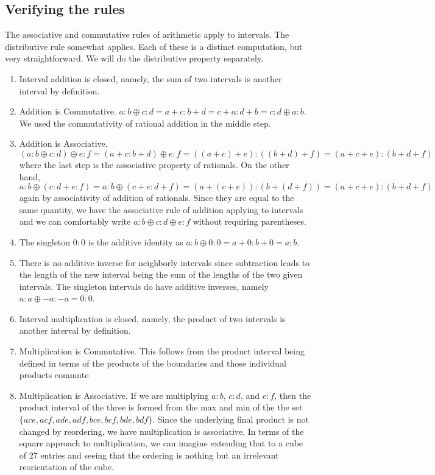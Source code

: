 \documentclass[12pt]{article}
\theoremstyle{remark}
\begin{document}
\subsection{Verifying the rules}\label{sec:rules}

The associative and commutative rules of arithmetic apply to intervals. The distributive rule somewhat applies. Each of these is a distinct computation, but very straightforward. We will do the distributive property separately. 

\begin{enumerate}
    \item Interval addition is closed, namely, the sum of two intervals is another interval by definition. 
    \item Addition is Commutative. $a:b \oplus c:d= a+c : b+d = c+a:d+b = c:d \oplus a:b$. We used the commutativity of rational addition in the middle step. 
    \item Addition is Associative. $(a:b \oplus c:d) \oplus e:f = (a+c:b+d) \oplus e:f = ((a+c)+e):((b+d)+f) = (a+c+e):(b+d+f)$ where the last step is the associative property of rationals.  On the other hand, $a:b \oplus (c:d+e:f) = a:b \oplus (c+e:d+f) = (a+(c+e)):(b+(d+f)) = (a+c+e):(b+d+f)$ again by associativity of addition of rationals. Since they are equal to the same quantity, we have the associative rule of addition applying to intervals and we can comfortably write $a:b \oplus c:d \oplus e:f$ without requiring parentheses. 
    \item The singleton $0:0$ is the additive identity as $a:b \oplus 0:0 = a+0:b+0 = a:b$. 
    \item There is no additive inverse for neighborly intervals since subtraction leads to the length of the new interval being the sum of the lengths of the two given intervals. The singleton intervals do have additive inverses, namely $a:a \oplus -a:-a = 0:0$. 
    \item Interval multiplication is closed, namely, the product of two intervals is another interval by definition. 
    \item Multiplication is Commutative. This follows from the product interval being defined in terms of the products of the boundaries and those individual products commute. 
    \item Multiplication is Associative. If we are multiplying $a:b$, $c:d$, and $e:f$, then the product interval of the three is formed from the max and min of the the set $\{ace, acf, ade, adf, bce, bcf, bde, bdf\}$. Since the underlying final product is not changed by reordering, we have multiplication is associative. In terms of the square approach to multiplication, we can imagine extending that to a cube of 27 entries and seeing that the ordering is nothing but an irrelevant reorientation of the cube. 

\end{enumerate}
\end{document}
